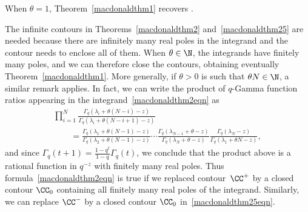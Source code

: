 \begin{rem}
When $\theta = 1$, Theorem~\ref{macdonaldthm1} recovers \cite[Theorem~3.6]{GP}.
\end{rem}

\begin{rem}\label{macdonaldthetaNinteger}
The inf\/inite contours in Theorems~\ref{macdonaldthm2} and~\ref{macdonaldthm25} are needed because there are inf\/initely many real poles in the integrand and the contour needs to enclose all of them. When $\theta\in\N$, the integrands have f\/initely many poles, and we can therefore close the contours, obtaining eventually Theorem~\ref{macdonaldthm1}. More generally, if $\theta > 0$ is such that $\theta N \in\N$, a similar remark applies. In fact, we can write the product of $q$-Gamma function ratios appearing in the integrand~\eqref{macdonaldthm2eqn} as
\begin{gather}
\prod_{i=1}^N{\frac{\Gamma_q(\lambda_i + \theta(N-i)-z)}{\Gamma_q(\lambda_i + \theta(N-i+1)-z)}}\nonumber\\
 \qquad{} = \frac{\Gamma_q(\lambda_1 + \theta(N-1) - z)}{\Gamma_q(\lambda_2 + \theta(N-1)-z)}\cdots\frac{\Gamma_q(\lambda_{N-1} + \theta - z)}{\Gamma_q(\lambda_N + \theta-z)}\frac{\Gamma_q(\lambda_N - z)}{\Gamma_q(\lambda_1 + \theta N - z)},\label{ratioqgammas}
\end{gather}
and since $\Gamma_q(t+1) = \frac{1 - q^t}{1 - q}\Gamma_q(t)$, we conclude that the product above is a rational function in $q^{-z}$ with f\/initely many real poles. Thus formula~\eqref{macdonaldthm2eqn} is true if we replaced contour~$\CC^+$ by a closed contour $\CC_0$ containing all f\/initely many real poles of the integrand. Similarly, we can replace $\CC^-$ by a closed contour $\CC_0$ in~\eqref{macdonaldthm25eqn}.
\end{rem}
